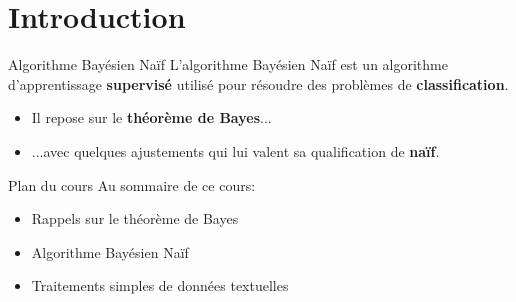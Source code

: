 \section[Introduction]{Introduction}

\begin{frame}{Algorithme Bayésien Naïf}
	L'algorithme Bayésien Naïf est un algorithme d'apprentissage \textbf{supervisé} utilisé pour résoudre des problèmes de \textbf{classification}. \\
	\pause
	\vspace{0.5cm}
	\begin{itemize}
		\item Il repose sur le \textbf{théorème de Bayes}...
		\pause
		\item ...avec quelques ajustements qui lui valent sa qualification de \textbf{naïf}.
	\end{itemize}
\end{frame}

\begin{frame}{Plan du cours}
	Au sommaire de ce cours:
	\begin{itemize}
		\item Rappels sur le théorème de Bayes
		\item Algorithme Bayésien Naïf
		\item Traitements simples de données textuelles
	\end{itemize}
\end{frame}

